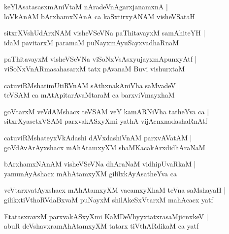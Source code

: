 \documentclass[twoside,12pt,openright]{book}
\newcounter{shloka}[chapter]
\begin{document}
\begin{shloka}%
keYlAsatasasxmAniVtaM nAradeVnAgarxjanamxnA |\\
loVkAnAM bArxhamxNAnA ca kaSxtirxyANAM visheVSataH 
\end{shloka}

\begin{shloka}%
sitxrXVshUdArxNAM visheVSeVNa paThitavayxM samAhiteYH |\\
idaM pavitarxM paramaM puNayxmAyuSayxvadhaRnaM 
\end{shloka}

\begin{shloka}%
paThitavayxM visheVSeVNa viSoNxVsAsxyujayxmApunxyAtf |\\
viSoNxVnARmasahasarxM tatx pAvanaM Buvi vishurxtaM 
\end{shloka}

\begin{shloka}%
catuviRMshatimUtiRVnAM sAthxnakAniVha saMvadeV |\\
teVSAM ca mAtApitarAvaMtaraM ca barxviVmayxhaM 
\end{shloka}

\begin{shloka}%
goVtarxM veVdAMshacx teVSAM veY kamARNiVha tatheYva ca |\\
sitxrXyasetxVSAM parxvakASxyXmi yathA vijAcnxnadashaRnAtf
\end{shloka}

\begin{shloka}%
catuviRMshateyxVkAdashi dAVxdashiVnAM parxvAVatAM |\\
goVdAvArAyxshacx mAhAtamxyXM shaMKacakArxdidhAraNaM 
\end{shloka}

\begin{shloka}%
bArxhamxNAnAM visheVSeVNa  dhAraNaM vidhipUvaRkaM |\\
yamunAyAshacx mAhAtamxyXM gililxkAyAsatheYva ca 
\end{shloka}

\begin{shloka}%
veVtarxvatAyxshacx mAhAtamxyXM vacamxyXhaM teVna saMshayaH |\\
gilikxtiVthoRVdaBxvaM puNayxM shilAkeSxVtarxM mahAcacx yatf
\end{shloka}

\begin{shloka}%
EtatasxravxM parxvakASxyXmi KaMDeVhyyxtatxrasaMjicnxkeV |\\
abuR deVshavxramAhAtamxyXM tatarx tiVthARdikaM ca yatf 
\end{shloka}
\end{document}
